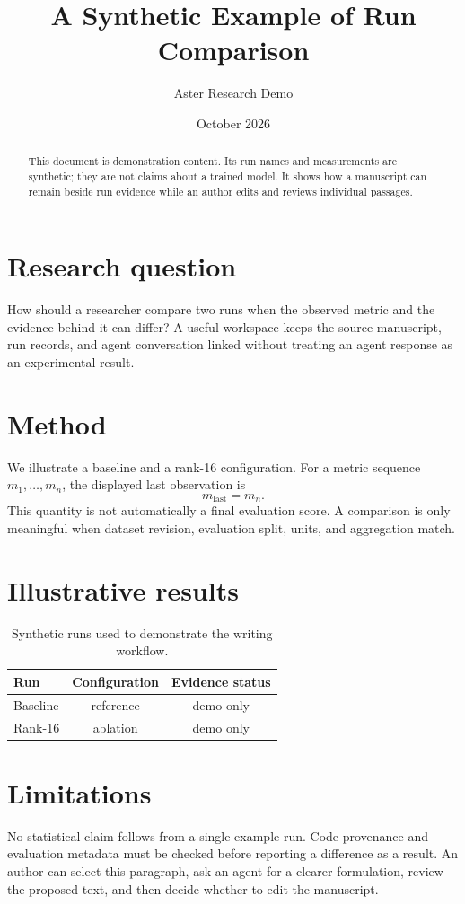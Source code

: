 \documentclass[11pt]{article}
\title{A Synthetic Example of Run Comparison}
\author{Aster Research Demo}
\date{October 2026}
\begin{document}
\maketitle

\begin{abstract}
This document is demonstration content. Its run names and measurements are synthetic;
they are not claims about a trained model. It shows how a manuscript can remain beside
run evidence while an author edits and reviews individual passages.
\end{abstract}

\section{Research question}
How should a researcher compare two runs when the observed metric and the evidence
behind it can differ? A useful workspace keeps the source manuscript, run records,
and agent conversation linked without treating an agent response as an experimental result.

\section{Method}
We illustrate a baseline and a rank-16 configuration. For a metric sequence
$m_1,\ldots,m_n$, the displayed last observation is
\begin{equation}
  m_{\mathrm{last}} = m_n.
\end{equation}
This quantity is not automatically a final evaluation score. A comparison is only
meaningful when dataset revision, evaluation split, units, and aggregation match.

\section{Illustrative results}
\begin{table}[h]
  \centering
  \begin{tabular}{lcc}
    \toprule
    Run & Configuration & Evidence status \\
    \midrule
    Baseline & reference & demo only \\
    Rank-16 & ablation & demo only \\
    \bottomrule
  \end{tabular}
  \caption{Synthetic runs used to demonstrate the writing workflow.}
\end{table}

\section{Limitations}
No statistical claim follows from a single example run. Code provenance and
evaluation metadata must be checked before reporting a difference as a result.
An author can select this paragraph, ask an agent for a clearer formulation,
review the proposed text, and then decide whether to edit the manuscript.
\end{document}
